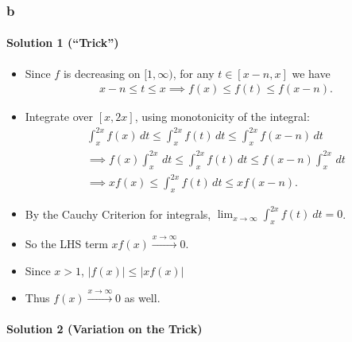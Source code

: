 \begin{solution}
\hypertarget{b-8}{%
\subsubsection{b}\label{b-8}}

\hypertarget{solution-1-trick}{%
\paragraph{Solution 1 (``Trick'')}\label{solution-1-trick}}

\begin{itemize}
\item
  Since \(f\) is decreasing on \([1, \infty)\), for any
  \(t\in [x-n, x]\) we have
  \begin{align*}
  x-n \leq t \leq x \implies f(x) \leq f(t) \leq f(x-n)
  .\end{align*}
\item
  Integrate over \([x, 2x]\), using monotonicity of the integral:
  \begin{align*}
  \int_x^{2x} f(x) \,dt \leq 
  \int_x^{2x} f(t) \,dt \leq 
  \int_x^{2x} f(x-n) \,dt \\ 
  \implies 
  f(x) \int_x^{2x} \,dt \leq 
  \int_x^{2x} f(t) \,dt \leq 
  f(x-n) \int_x^{2x} \,dt  \\
  \implies xf(x) \leq \int_x^{2x} f(t) \, dt \leq xf(x-n)
  .\end{align*}
\item
  By the Cauchy Criterion for integrals,
  \(\lim_{x\to \infty} \int_x^{2x} f(t)~dt = 0\).
\item
  So the LHS term \(xf(x) \overset{x\to\infty}\to 0\).
\item
  Since \(x>1\),
  \({\left\lvert {f(x)} \right\rvert} \leq {\left\lvert {xf(x)} \right\rvert}\)
\item
  Thus \(f(x) \overset{x\to\infty}\to 0\) as well.
\end{itemize}

\hypertarget{solution-2-variation-on-the-trick}{%
\paragraph{Solution 2 (Variation on the
Trick)}\label{solution-2-variation-on-the-trick}}


\end{solution}
